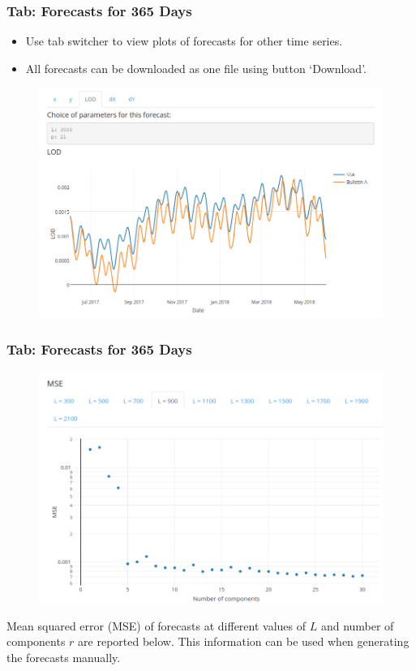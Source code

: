 \documentclass[pdf, unicode, notheorems, xcolor={table}]{beamer}
\begin{document}
\begin{frame}\frametitle{Tab: Forecasts for 365 Days}
	\begin{itemize}
	\item Use tab switcher to view plots of forecasts for other time series.
	\item All forecasts can be downloaded as one file using button `Download'.
	\end{itemize}
	\begin{figure}
		\includegraphics[width=0.9 \linewidth]{tab_lod}
	\end{figure}
\end{frame}

\begin{frame}\frametitle{Tab: Forecasts for 365 Days}
	\begin{figure}
		\includegraphics[width=0.8 \linewidth]{mse}
	\end{figure}

	Mean squared error (MSE) of forecasts at different values of $L$ and number of components $r$ are reported below. This information can be used when generating the forecasts manually.
\end{frame}
\end{document}
